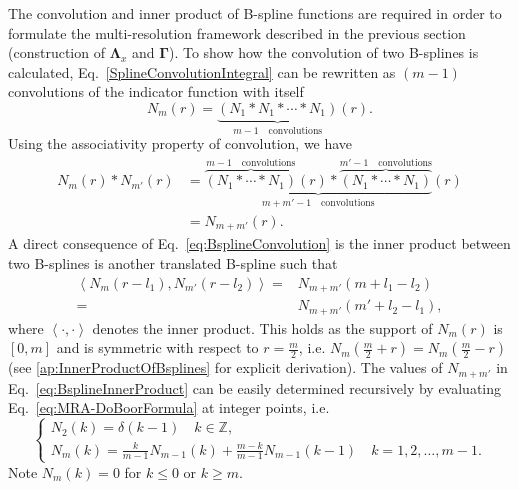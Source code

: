 \documentclass[review,authoryear,3p]{elsarticle}
\begin{document}
The convolution and inner product of B-spline functions are required in order to formulate the multi-resolution framework described in the previous section (construction of $\boldsymbol\Lambda_{x}$ and $\boldsymbol\Gamma$). To show how the convolution of two B-splines is calculated, Eq.~\eqref{SplineConvolutionIntegral} can be rewritten as $(m-1)$ convolutions of the indicator function with itself
\begin{equation}\label{eq:N1convolutions}
 N_{m}\left(r\right)=\underbrace{\left(N_{1}\ast N_{1}\ast \cdots \ast N_{1}\right)}_{m-1\quad \text{convolutions}}\left(r\right).
\end{equation}
Using the associativity property of convolution, we have
\setlength{\arraycolsep}{0.0em}
\begin{align}\label{eq:BsplineConvolution}
N_{m}\left( r\right) \ast N_{m'}\left(r\right)&=\underbrace{\overbrace{\left(N_{1} \ast \cdots \ast N_{1}\right)}^{m-1 \quad \text{convolutions}}\left(r\right) \ast \overbrace{\left(N_{1} \ast \cdots \ast N_{1}\right)}^{m'-1\quad \text{convolutions}}}_{m+m'-1 \quad \text{convolutions}}\left(r\right)\nonumber\\
&=N_{m+m'}\left(r\right).
\end{align}
A direct consequence of Eq.~\eqref{eq:BsplineConvolution} is the inner product between two B-splines is another translated B-spline such that
\begin{align}
 \left\langle N_{m}\left(r-l_{1}\right), N_{m'}\left(r-l_{2}\right)\right\rangle=&N_{m+m'}\left(m+l_{1}-l_{2}\right)\nonumber \\
=&N_{m+m'}\left(m'+l_{2}-l_{1}\right),
\label{eq:BsplineInnerProduct}
\end{align}
where $\left\langle \cdot,\cdot\right\rangle $ denotes the inner product. This holds as the support of $N_m\left(r\right)$ is $\left[ 0,m\right]$ and  is symmetric with respect to $r=\frac{m}{2}$, i.e. $ N_{m}\left(\frac{m}{2}+r\right)=N_{m}\left(\frac{m}{2}-r\right)$ (see \ref{ap:InnerProductOfBsplines} for explicit derivation). The values of $N_{m+m'}$ in Eq.~\eqref{eq:BsplineInnerProduct} can be easily determined recursively by evaluating Eq.~\eqref{eq:MRA-DoBoorFormula} at integer points, i.e.
 \begin{equation}\label{eq:MRA-recursiveBsplineatintegerpoints}
 \begin{cases}
 N_2(k)=\delta(k-1)\quad k\in \mathbb{Z}, \\
 N_{m}\left(k\right)=\frac{k}{m-1}N_{m-1}\left(k\right)+\frac{m-k}{m-1}N_{m-1}\left(k-1\right) \quad k=1,2,\dots,m-1.
  \end{cases}
 \end{equation}
Note $N_{m}\left(k\right)=0$ for $k\le0$ or $k\ge m$. 
\end{document}
